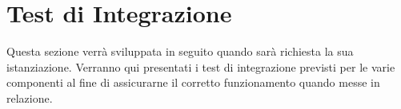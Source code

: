 \documentclass[PianoDiQualifica.tex]{subfiles}
\begin{document}
\chapter{Test di Integrazione}
Questa sezione verrà sviluppata in seguito quando sarà richiesta la sua istanziazione.
Verranno qui presentati i test di integrazione previsti per le varie componenti al fine di assicurarne il corretto funzionamento quando messe in relazione.
\end{document}
